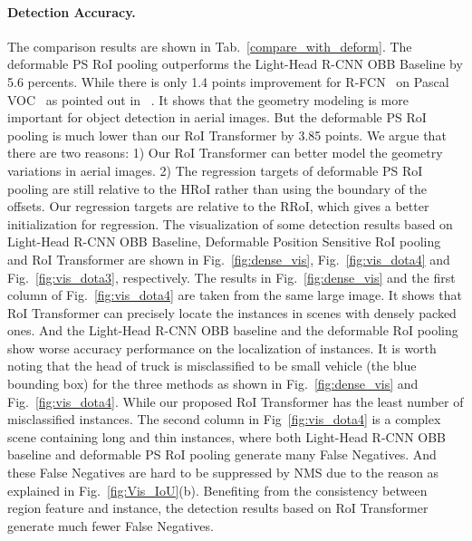 \documentclass[11pt,onecolumn]{article}         \usepackage[top=3.6cm, bottom=3.2cm, left=2.3cm, right=2.3cm]{geometry}
\begin{document}
\paragraph{Detection Accuracy.}
The comparison results are shown in Tab.~\ref{compare_with_deform}. The deformable PS RoI pooling outperforms the Light-Head R-CNN OBB Baseline by 5.6 percents. While there is only 1.4 points improvement for R-FCN~\cite{R-FCN} on Pascal VOC~\cite{PASCALVOC} as pointed out in ~\cite{Deformable}. It shows that the geometry modeling is more important for object detection in aerial images. But the deformable PS RoI pooling is much lower than our RoI Transformer by 3.85 points.
We argue that there are two reasons: 1) Our RoI Transformer can better model the geometry variations in aerial images. 2)
The regression targets of deformable PS RoI pooling are still relative to the HRoI rather than using the boundary of the offsets. Our regression targets are relative to the RRoI, which gives a better initialization for regression. The visualization of some detection results based on Light-Head R-CNN OBB Baseline, Deformable Position Sensitive RoI pooling and RoI Transformer are shown in Fig.~\ref{fig:dense_vis}, Fig.~\ref{fig:vis_dota4} and Fig.~\ref{fig:vis_dota3}, respectively. The results in Fig.~\ref{fig:dense_vis} and the first column of Fig.~\ref{fig:vis_dota4} are taken from the same large image. It shows that RoI Transformer can precisely locate the instances in scenes with densely packed ones. And the Light-Head R-CNN OBB baseline and the deformable RoI pooling show worse accuracy performance on the  localization of instances. It is worth noting that the head of truck is misclassified to be small vehicle (the blue bounding box) for the three methods as shown in Fig.~\ref{fig:dense_vis} and Fig.~\ref{fig:vis_dota4}. While our proposed RoI Transformer has the least number of misclassified instances. The second column in Fig~\ref{fig:vis_dota4} is a complex scene containing long and thin instances, where both Light-Head R-CNN OBB baseline and deformable PS RoI pooling generate many False Negatives. And these False Negatives are hard to be suppressed by NMS due to the reason as explained in Fig.~\ref{fig:Vis_IoU}(b). Benefiting from the consistency between region feature and instance, the detection results based on RoI Transformer generate much fewer False Negatives.
\end{document}
